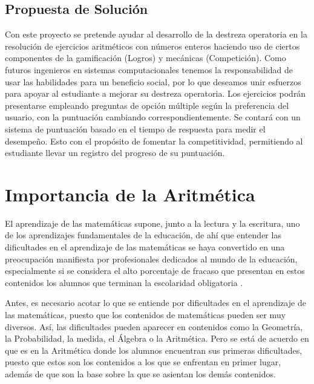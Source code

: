 \documentclass{article}
\begin{document}
\subsection{Propuesta de Solución}
Con este proyecto se pretende ayudar al desarrollo de la destreza operatoria en la resolución de ejercicios aritméticos con números enteros haciendo uso de ciertos componentes de la gamificación (Logros) y mecánicas (Competición). Como futuros ingenieros en sistemas computacionales tenemos la responsabilidad de usar las habilidades para un beneficio social, por lo que deseamos unir esfuerzos para apoyar al estudiante a mejorar su destreza operatoria.
Los ejercicios podrán presentarse empleando preguntas de opción múltiple según la preferencia del usuario,
con la puntuación cambiando correspondientemente. Se contará con un sistema de puntuación basado en el tiempo de
respuesta para medir el desempeño. Esto con el propósito de fomentar la competitividad, permitiendo al estudiante llevar
un registro del progreso de su puntuación.
\section{Importancia de la Aritmética}
El aprendizaje de las matemáticas supone, junto a la lectura y la escritura, uno de los aprendizajes fundamentales de la educación, de ahí que entender las dificultades en el aprendizaje de las matemáticas se haya convertido en una preocupación manifiesta por profesionales dedicados al mundo de la educación, especialmente si se considera el alto porcentaje de fracaso que presentan en estos contenidos los alumnos que terminan la escolaridad obligatoria \cite{pisa2010results}. 

Antes, es necesario acotar lo que se entiende por dificultades en el aprendizaje de las matemáticas, puesto que los contenidos de matemáticas pueden ser muy diversos. Así, las dificultades pueden aparecer en contenidos como la Geometría, la Probabilidad, la medida, el Álgebra o la Aritmética. Pero se está de acuerdo en que es en la Aritmética donde los alumnos encuentran sus primeras dificultades, puesto que estos son los contenidos a los que se enfrentan en primer lugar, además de que son la base sobre la que se asientan los demás contenidos. 
\end{document}
